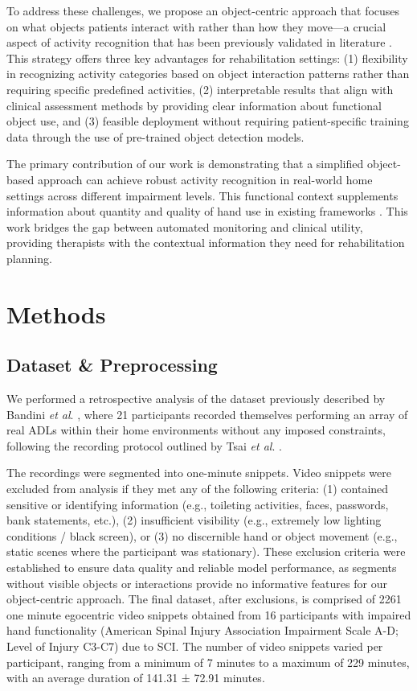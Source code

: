 \documentclass[journal,twoside,web]{ieeecolor}
\begin{document}
To address these challenges, we propose an object-centric approach that focuses on what objects patients interact with rather than how they move---a crucial aspect of activity recognition that has been previously validated in literature \cite{Fathi2011-hk, Pirsiavash2012-ly, Nabiei2015-wb, Lonini2016-wg, Granada2020-ge}. This strategy offers three key advantages for rehabilitation settings: (1) flexibility in recognizing activity categories based on object interaction patterns rather than requiring specific predefined activities, (2) interpretable results that align with clinical assessment methods by providing clear information about functional object use, and (3) feasible deployment without requiring patient-specific training data through the use of pre-trained object detection models.

The primary contribution of our work is demonstrating that a simplified object-based approach can achieve robust activity recognition in real-world home settings across different impairment levels. This functional context supplements information about quantity \cite{Bandini2022-rs} and quality \cite{Dousty2023-kn, Zhao2024-bc} of hand use in existing frameworks \cite{Kadambi2023-iv}. This work bridges the gap between automated monitoring and clinical utility, providing therapists with the contextual information they need for rehabilitation planning.

\section{Methods}
\subsection{Dataset \& Preprocessing}

We performed a retrospective analysis of the dataset previously described by Bandini \textit{et al}. \cite{Bandini2022-rs}, where 21 participants recorded themselves performing an array of real ADLs within their home environments without any imposed constraints, following the recording protocol outlined by Tsai \textit{et al}. \cite{Tsai2020-up}.

The recordings were segmented into one-minute snippets. Video snippets were excluded from analysis if they met any of the following criteria: (1) contained sensitive or identifying information (e.g., toileting activities, faces, passwords, bank statements, etc.), (2) insufficient visibility (e.g., extremely low lighting conditions / black screen), or (3) no discernible hand or object movement (e.g., static scenes where the participant was stationary). These exclusion criteria were established to ensure data quality and reliable model performance, as segments without visible objects or interactions provide no informative features for our object-centric approach. The final dataset, after exclusions, is comprised of 2261 one minute egocentric video snippets obtained from 16 participants with impaired hand functionality (American Spinal Injury Association Impairment Scale A-D; Level of Injury C3-C7) due to SCI. The number of video snippets varied per participant, ranging from a minimum of 7 minutes to a maximum of 229 minutes, with an average duration of 141.31 ± 72.91 minutes.
\end{document}
